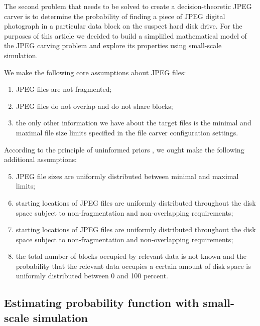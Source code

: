 \documentclass[final,5p,times,twocolumn,authoryear]{elsarticle}
\begin{document}
The second problem that needs to be solved to create a decision-theoretic JPEG carver is to determine the probability of finding a piece of JPEG digital photograph in a particular data block on the suspect hard disk drive. For the purposes of this article we decided to build a simplified mathematical model of the JPEG carving problem and explore its properties using small-scale simulation. 

We make the following core assumptions about JPEG files:

\begin{enumerate}
\item{JPEG files are not fragmented;}
\item{JPEG files do not overlap and do not share blocks;}
\item{the only other information we have about the target files is the minimal and maximal file size limits specified in the file carver configuration settings.} 
\end{enumerate}

According to the principle of uninformed priors \citep{jaynes2003probability}, we ought make the following additional assumptions:

\begin{enumerate}
\setcounter{enumi}{4}
\item{JPEG file sizes are uniformly distributed between minimal and maximal limits;}
\item{starting locations of JPEG files are uniformly distributed throughout the disk space subject to non-fragmentation and non-overlapping requirements;}
\item{starting locations of JPEG files are uniformly distributed throughout the disk space subject to non-fragmentation and non-overlapping requirements;}
\item{the total number of blocks occupied by relevant data is not known and the probability that the relevant data occupies a certain amount of disk space is uniformly distributed between 0 and 100 percent.}
\end{enumerate}

\subsection{Estimating probability function with small-scale simulation}
\end{document}

